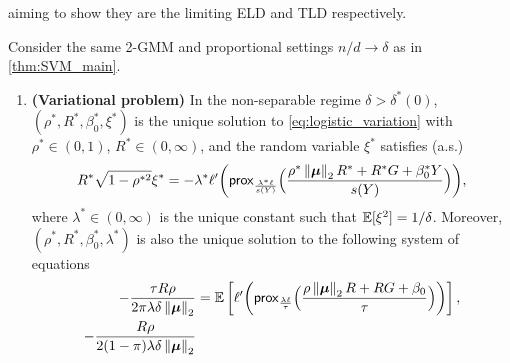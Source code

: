     aiming to show they are the limiting ELD and TLD respectively.

\begin{thm} \label{thm:logistic_main}
    Consider the same 2-GMM and proportional settings $n/d \to \delta$ as in \cref{thm:SVM_main}. 
    \begin{enumerate}[label=(\alph*)]
        \item \label{thm:logistic_main(a)}
        \textbf{(Variational problem)} In the non-separable regime $\delta > \delta^*(0)$, $(\rho^*, R^*, \beta_0^*, \xi^*)$ is the unique solution to \cref{eq:logistic_variation} with $\rho^* \in (0, 1)$, $R^* \in (0, \infty)$, and the random variable $\xi^*$ satisfies (a.s.)
        \begin{equation}\label{eq:logistic_xi_star}
            R^* \sqrt{1 - \rho^{*2}} \xi^*  =  -\lambda^* 
            \ell' \biggl( \mathsf{prox}_{\frac{\lambda^* \ell}{s(Y)}}\Bigl( \frac{\rho^* \left\|{{\boldsymbol{\mu}}}\right\|_2 R^* + R^* G + \beta_0^* Y}{s(Y)} \Bigr) \biggr) ,
        \end{equation}
        where $\lambda^* \in (0, \infty)$ is the unique constant such that $\mathbb{E}[ \xi^2] = 1/\delta$.
        Moreover, $(\rho^*, R^*, \beta_0^*, \lambda^*)$ is also the unique solution to the following system of equations
        \begin{align*}
            - \frac{\tau R \rho}{2\pi \lambda \delta \norm{\vmu}_2}
            & = 
            \E\left[ \ell'\biggl( \prox_{\frac{\lambda\ell}{\tau}}\Bigl( \frac{\rho\norm{\vmu}_2 R + RG + \beta_0}{\tau} \Bigr) \biggr) \right] ,
            \\
            - \frac{R \rho}{2(1 - \pi) \lambda \delta \norm{\vmu}_2}

\end{align*}
\end{enumerate}
\end{thm}

